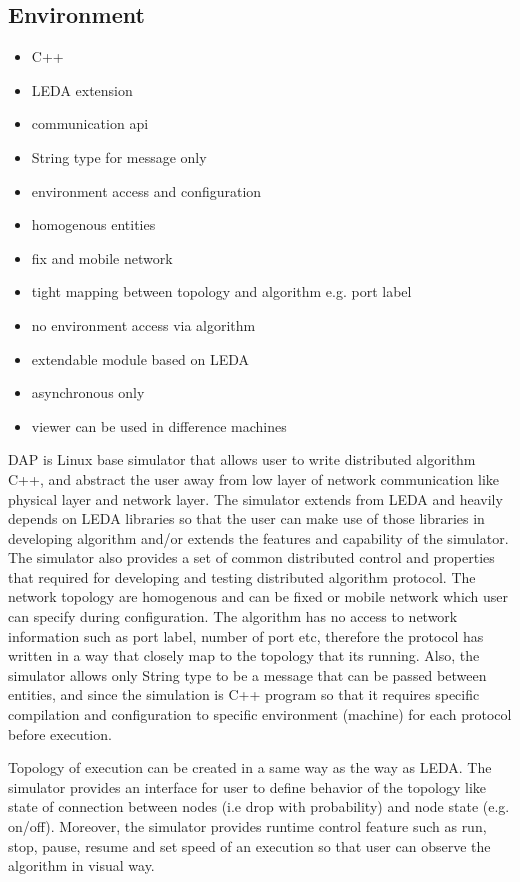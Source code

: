 \subsection*{Environment}
\begin{itemize}
\item C++
\item LEDA extension
\item communication api
\item String type for message only
\item environment access and configuration
\item homogenous entities
\item fix and mobile network
\item tight mapping between topology and algorithm e.g. port label
\item no environment access via algorithm
\item extendable module based on LEDA
\item asynchronous only
\item viewer can be used in difference machines
\end{itemize}

DAP is Linux base simulator that allows user to write distributed algorithm C++, and abstract the user away from low layer of network communication like physical layer and network layer. The simulator extends from LEDA and heavily depends on LEDA libraries so that the user can make use of those libraries in developing algorithm and/or extends the features and capability of the simulator. The simulator also provides a set of common distributed control and properties that required for developing and testing distributed algorithm protocol. The network topology are homogenous and can be fixed or mobile network which user can specify during configuration. The algorithm has no access to network information such as port label, number of port etc, therefore the protocol has written in a way that closely map to the topology that its running. Also, the simulator allows only String type to be a message that can be passed between entities, and since the simulation is C++ program so that it requires specific compilation and configuration to specific environment (machine) for each protocol before execution.

Topology of execution can be created in a same way as the way as LEDA. The simulator provides an interface for user to define behavior of the topology like state of connection between nodes (i.e drop with probability) and node state (e.g. on/off). Moreover, the simulator provides runtime control feature such as run, stop, pause, resume and set speed of an execution so that user can observe the algorithm in visual way.

